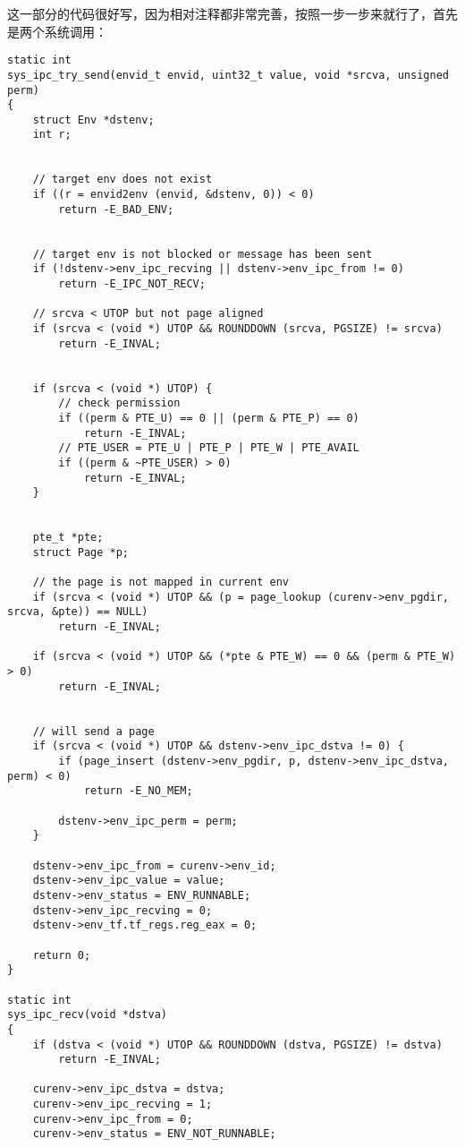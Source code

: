 \documentclass{article}
\begin{document}
\begin{CJK*}{UTF8}{gkai}
这一部分的代码很好写，因为相对注释都非常完善，按照一步一步来就行了，首先是两个系统调用：

\begin{lstlisting}[style=ccode, title={\scriptsize \ttfamily \bfseries kern/syscall.c}]
static int
sys_ipc_try_send(envid_t envid, uint32_t value, void *srcva, unsigned perm)
{
    struct Env *dstenv;
    int r;


    // target env does not exist
    if ((r = envid2env (envid, &dstenv, 0)) < 0)
        return -E_BAD_ENV;


    // target env is not blocked or message has been sent
    if (!dstenv->env_ipc_recving || dstenv->env_ipc_from != 0)
        return -E_IPC_NOT_RECV;

    // srcva < UTOP but not page aligned
    if (srcva < (void *) UTOP && ROUNDDOWN (srcva, PGSIZE) != srcva)
        return -E_INVAL;


    if (srcva < (void *) UTOP) {
        // check permission
        if ((perm & PTE_U) == 0 || (perm & PTE_P) == 0)
            return -E_INVAL;
        // PTE_USER = PTE_U | PTE_P | PTE_W | PTE_AVAIL
        if ((perm & ~PTE_USER) > 0)
            return -E_INVAL;
    }


    pte_t *pte;
    struct Page *p;

    // the page is not mapped in current env
    if (srcva < (void *) UTOP && (p = page_lookup (curenv->env_pgdir, srcva, &pte)) == NULL)
        return -E_INVAL;

    if (srcva < (void *) UTOP && (*pte & PTE_W) == 0 && (perm & PTE_W) > 0)
        return -E_INVAL;


    // will send a page
    if (srcva < (void *) UTOP && dstenv->env_ipc_dstva != 0) {
        if (page_insert (dstenv->env_pgdir, p, dstenv->env_ipc_dstva, perm) < 0)
            return -E_NO_MEM;

        dstenv->env_ipc_perm = perm;
    }

    dstenv->env_ipc_from = curenv->env_id;
    dstenv->env_ipc_value = value;
    dstenv->env_status = ENV_RUNNABLE;
    dstenv->env_ipc_recving = 0;
    dstenv->env_tf.tf_regs.reg_eax = 0;

    return 0;
}

static int
sys_ipc_recv(void *dstva)
{
    if (dstva < (void *) UTOP && ROUNDDOWN (dstva, PGSIZE) != dstva)
        return -E_INVAL;

    curenv->env_ipc_dstva = dstva;
    curenv->env_ipc_recving = 1;
    curenv->env_ipc_from = 0;
    curenv->env_status = ENV_NOT_RUNNABLE;


\end{lstlisting}
\end{CJK*}
\end{document}
